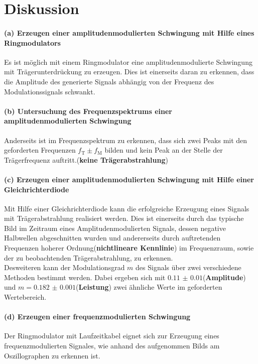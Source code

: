 \FloatBarrier
\section{Diskussion}
\label{sec:Diskussion}


\paragraph{(a) Erzeugen einer amplitudenmodulierten Schwingung mit
Hilfe eines Ringmodulators}
Es ist möglich mit einem Ringmodulator
eine amplitudenmodulierte Schwingung
mit Trägerunterdrückung zu erzeugen.
Dies ist einerseits daran zu erkennen,
dass die Amplitude des generierte Signals abhängig
von der Frequenz des Modulationssignals schwankt.

\paragraph{(b) Untersuchung des Frequenzspektrums einer
amplitudenmodulierten Schwingung}
Anderseits ist im Frequenzspektrum zu erkennen, dass sich zwei
Peaks mit den geforderten Frequenzen $f_{\text{T}}\pm f_{\text{M}}$
bilden
und kein Peak an der Stelle der Trägerfrequenz
auftritt.(\textbf{keine Trägerabstrahlung})


\paragraph{(c) Erzeugen einer amplitudenmodulierten Schwingung
mit Hilfe einer Gleichrichterdiode}
Mit Hilfe einer Gleichrichterdiode kann
die erfolgreiche Erzeugung eines Signals mit Trägerabstrahlung
realisiert werden.
Dies ist einerseits durch das typische Bild im Zeitraum eines
Amplitudenmodulierten Signals, dessen negative Halbwellen
abgeschnitten wurden
und andererseits durch auftretenden Frequenzen hoherer
Ordnung(\textbf{nichtlineare Kennlinie})
im Frequenzraum, sowie der zu beobachtenden
Trägerabstrahlung, zu erkennen. \\
Desweiteren kann der Modulationsgrad $m$ des Signals
über zwei verschiedene
Methoden bestimmt werden. Dabei ergeben sich mit
$\num{0.11(1)}$(\textbf{Amplitude}) und $m=\num{0.182(1)}$(\textbf{Leistung})
zwei ähnliche Werte
im geforderten Wertebereich.

\paragraph{(d) Erzeugen einer frequenzmodulierten Schwingung}
Der Ringmodulator mit Laufzeitkabel eignet sich zur Erzeugung
eines frequenzmodulierten Signales, wie anhand des aufgenommen Bilds
am Oszillographen zu erkennen ist.

